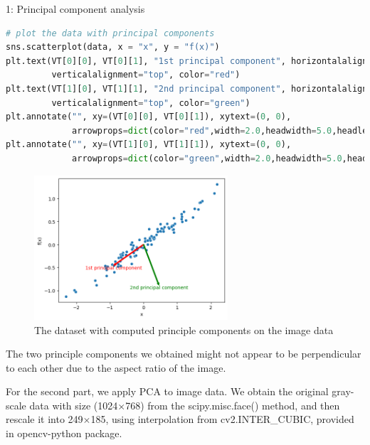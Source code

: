 \documentclass[10pt,a4paper]{article}
\begin{document}
\begin{task}{1: Principal component analysis}
\begin{lstlisting}[language = Python, label={decoupling}]
# plot the data with principal components
sns.scatterplot(data, x = "x", y = "f(x)")
plt.text(VT[0][0], VT[0][1], "1st principal component", horizontalalignment="center", 
         verticalalignment="top", color="red")
plt.text(VT[1][0], VT[1][1], "2nd principal component", horizontalalignment="center", 
         verticalalignment="top", color="green")
plt.annotate("", xy=(VT[0][0], VT[0][1]), xytext=(0, 0),
             arrowprops=dict(color="red",width=2.0,headwidth=5.0,headlength=5.0))
plt.annotate("", xy=(VT[1][0], VT[1][1]), xytext=(0, 0),
             arrowprops=dict(color="green",width=2.0,headwidth=5.0,headlength=5.0))
\end{lstlisting}

\begin{figure} [H]
    \centering
    \includegraphics[width=7.2cm]{images/task1-1-1.png}
    \caption{The dataset with computed principle components on the image data}
    \label{fig:task1-1-1}
\end{figure}

The two principle components we obtained might not appear to be perpendicular to each other due to the aspect ratio of the image.

\bigskip
{}

For the second part, we apply PCA to image data. We obtain the original gray-scale data with size (1024$\times$768) from the scipy.misc.face() method, and then rescale it into 249$\times$185, using interpolation from cv2.INTER\_CUBIC, provided in opencv-python package.


\end{task}
\end{document}
